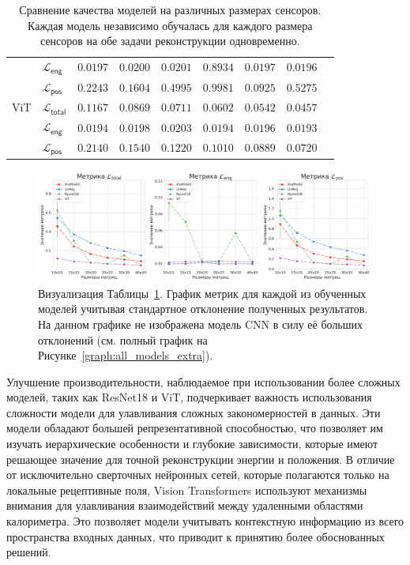 \documentclass[a4paper,12pt]{extarticle}
\begin{document}
\begin{table}[t]
\begin{tabular}{llrrrrrrr}
        {} & $\mathcal{L}_{\mathsf{eng}}$ & $\mathsf{0.0197}$ & $\mathsf{0.0200}$ & $\mathsf{0.0201}$ & $\mathsf{0.8934}$ & $\mathsf{0.0197}$ & $\mathsf{0.0196}$ \\
        {} & $\mathcal{L}_{\mathsf{pos}}$ & $\mathsf{0.2243}$ & $\mathsf{0.1604}$ & $\mathsf{0.4995}$ & $\mathsf{0.9981}$ & $\mathsf{0.0925}$ & $\mathsf{0.5275}$ \\
        \midrule
        \textsf{ViT} & $\mathcal{L}_{\mathsf{total}}$ & $\mathsf{0.1167}$ & $\mathsf{0.0869}$ & $\mathsf{0.0711}$ & $\mathsf{0.0602}$ & $\mathsf{0.0542}$ & $\mathsf{0.0457}$ \\
        {} & $\mathcal{L}_{\mathsf{eng}}$ & $\mathsf{0.0194}$ & $\mathsf{0.0198}$ & $\mathsf{0.0203}$ & $\mathsf{0.0194}$ & $\mathsf{0.0196}$ & $\mathsf{0.0193}$ \\
        {} & $\mathcal{L}_{\mathsf{pos}}$ & $\mathsf{0.2140}$ & $\mathsf{0.1540}$ & $\mathsf{0.1220}$ & $\mathsf{0.1010}$ & $\mathsf{0.0889}$ & $\mathsf{0.0720}$ \\
        
		\bottomrule
	\end{tabular}
    \caption{Сравнение качества моделей на различных размерах сенсоров. Каждая модель независимо обучалась для каждого размера сенсоров на обе задачи реконструкции одновременно.}
	\label{table:all_models}
\end{table}

\begin{figure}[t]
    \centering
    \includegraphics[width=1.0\textwidth]{graphics/models_comp.png}
    \caption{Визуализация Таблицы~\ref{table:all_models}. График метрик для каждой из обученных моделей учитывая стандартное отклонение полученных результатов. На данном графике не изображена модель \textsf{CNN} в силу её больших отклонений (см. полный график на Рисунке~\ref{graph:all_models_extra}).}
    \label{graph:all_models}
\end{figure}

Улучшение производительности, наблюдаемое при использовании более сложных моделей, таких как \textsf{ResNet18} и \textsf{ViT}, подчеркивает важность использования сложности модели для улавливания сложных закономерностей в данных. Эти модели обладают большей репрезентативной способностью, что позволяет им изучать иерархические особенности и глубокие зависимости, которые имеют решающее значение для точной реконструкции энергии и положения. В отличие от исключительно сверточных нейронных сетей, которые полагаются только на локальные рецептивные поля, Vision Transformers используют механизмы внимания для улавливания взаимодействий между удаленными областями калориметра. Это позволяет модели учитывать контекстную информацию из всего пространства входных данных, что приводит к принятию более обоснованных решений.
\end{document}
